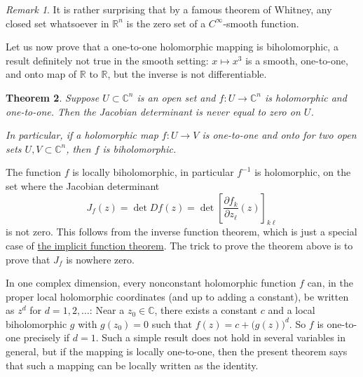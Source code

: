 \documentclass[12pt,openany]{book}
\newcommand{\C}{{\mathbb{C}}}
\newcommand{\R}{{\mathbb{R}}}
\theoremstyle{plain}
\newtheorem{thm}{Theorem}[section]
\theoremstyle{remark}
\newtheorem{remark}[thm]{Remark}
\theoremstyle{definition}
\theoremstyle{exercise}
\theoremstyle{example}
\begin{document}
\begin{remark}
It is rather surprising that by a famous theorem of Whitney,
any closed set whatsoever in $\R^n$
is the zero set of a $C^\infty$-smooth function.
\end{remark}

Let us now prove that a one-to-one holomorphic
mapping is biholomorphic, a result definitely not true in the
smooth setting: $x \mapsto x^3$ is a smooth, one-to-one,
and onto map
of $\R$ to $\R$, but the inverse is not differentiable.

\begin{thm} \label{thm:injective}
Suppose $U \subset \C^n$ is an open set and $f \colon U \to \C^n$ is
holomorphic and one-to-one.
Then the Jacobian determinant is never equal to zero on $U$.

In particular, if a holomorphic map $f \colon U \to V$ is
one-to-one and onto for two open sets $U,V \subset \C^n$, then $f$ is
biholomorphic.
\end{thm}

The function $f$ is locally biholomorphic, in particular
$f^{-1}$ is holomorphic,
on the set where the Jacobian determinant
\begin{equation*}
J_f(z) = \det Df(z) = \det \left[ \frac{\partial f_k}{\partial z_\ell}(z)
\right]_{k\ell}
\end{equation*}
is not zero.  This follows from the inverse function theorem, which is just
a special case of \hyperref[thm:ift]{the implicit function theorem}.
The trick to prove the theorem above is to prove that $J_f$ is nowhere zero.

In one complex dimension, every nonconstant holomorphic function $f$ can, in
the proper local holomorphic coordinates (and up to adding a constant),
be written as $z^d$ for $d=1,2,\ldots$:
Near a $z_0 \in \C$,
there exists a constant $c$ and a local biholomorphic $g$
with $g(z_0) = 0$ such that
$f(z) = c + {\bigl( g(z) \bigr)}^d$.
So $f$ is one-to-one precisely if $d=1$.
Such a simple result
does not hold in several variables in general, but if the mapping is
locally one-to-one, then the present theorem says that such a mapping can be
locally written as the identity.
\end{document}
